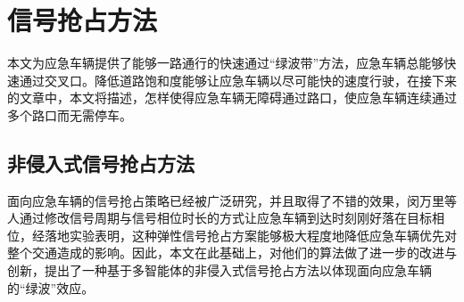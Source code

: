


\section{信号抢占方法}
本文为应急车辆提供了能够一路通行的快速通过“绿波带”方法，应急车辆总能够快速通过交叉口。降低道路饱和度能够让应急车辆以尽可能快的速度行驶，在接下来的文章中，本文将描述，怎样使得应急车辆无障碍通过路口，使应急车辆连续通过多个路口而无需停车。


\subsection{非侵入式信号抢占方法}
面向应急车辆的信号抢占策略已经被广泛研究，并且取得了不错的效果，闵万里等人\cite{min}通过修改信号周期与信号相位时长的方式让应急车辆到达时刻刚好落在目标相位，经落地实验表明，这种弹性信号抢占方案能够极大程度地降低应急车辆优先对整个交通造成的影响。因此，本文在此基础上，对他们的算法做了进一步的改进与创新，提出了一种基于多智能体的非侵入式信号抢占方法以体现面向应急车辆的“绿波”效应。


